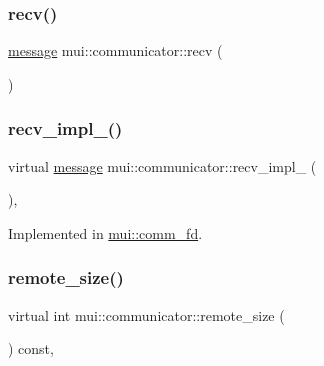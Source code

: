 \mbox{\label{classmui_1_1communicator_a1c2f180ccf56e7121333ccbeb1c70041}} 
\subsubsection{\texorpdfstring{recv()}{recv()}}
{\footnotesize\ttfamily \hyperlink{structmui_1_1message}{message} mui\+::communicator\+::recv (\begin{DoxyParamCaption}{ }\end{DoxyParamCaption})\hspace{0.3cm}{\ttfamily [inline]}}

\mbox{\label{classmui_1_1communicator_ab52ebf7dd059acdd144493cd76c62c5f}} 
\subsubsection{\texorpdfstring{recv\+\_\+impl\+\_\+()}{recv\_impl\_()}}
{\footnotesize\ttfamily virtual \hyperlink{structmui_1_1message}{message} mui\+::communicator\+::recv\+\_\+impl\+\_\+ (\begin{DoxyParamCaption}{ }\end{DoxyParamCaption})\hspace{0.3cm}{\ttfamily [protected]}, {}}



Implemented in \hyperlink{classmui_1_1comm__fd_a426bda7ebea0817e24fef87552993756}{mui\+::comm\+\_\+fd}.

\mbox{\label{classmui_1_1communicator_a8683d36801b78685ce5a58da2c6a6195}} 
\subsubsection{\texorpdfstring{remote\+\_\+size()}{remote\_size()}}
{\footnotesize\ttfamily virtual int mui\+::communicator\+::remote\+\_\+size (\begin{DoxyParamCaption}{ }\end{DoxyParamCaption}) const\hspace{0.3cm}{\ttfamily [inline]}, {\ttfamily [virtual]}}




